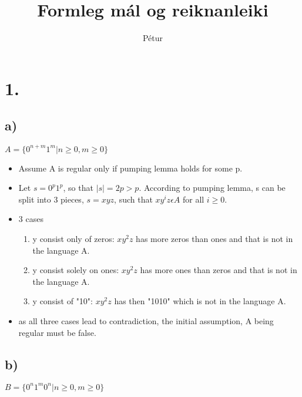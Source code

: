 \documentclass[]{article}
\begin{document}
\title{Formleg mál og reiknanleiki}
\author{Pétur}
\maketitle

\section*{1.}

\subsection*{a)}
$A = \{0^{n+m}1^{m}| n \geq 0, m \geq 0 \}$ \\
\begin{itemize}
	\item Assume A is regular only if pumping lemma holds for some p.
	\item Let $s = 0^{p}1^{p}$, so that $|s| = 2p > p$.
	 According to pumping lemma, s can be split into 3 pieces, 				$s=xyz$, such that $xy^{i}z \epsilon A$ for all $i \geq 0$.
	\item 3 cases
	\begin{enumerate}
		\item y consist only of zeros: $xy^{2}z$ has more zeros than 		ones and that is not in the language A.
		\item y consist solely on ones: $xy^{2}z$  has more ones 				than zeros and that is not in the language A.
		\item y consist of "10": $xy^{2}z$ has then "1010" which is 			not in the language A.
	\end{enumerate}
	\item as all three cases lead to contradiction, the initial assumption, A being regular must be false.
\end{itemize}

\subsection*{b)}
$B = \{0^{n}1^{m}0^{n}|n \geq 0, m \geq 0\}$
\end{document}
